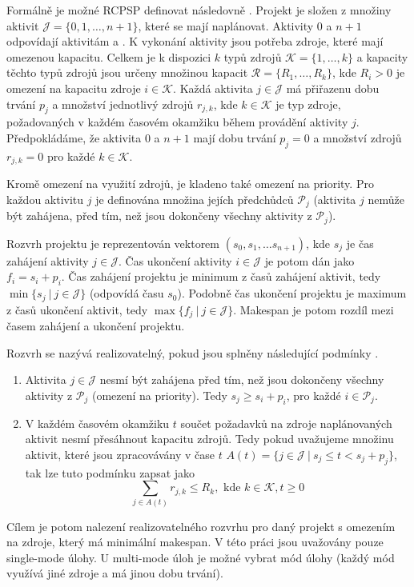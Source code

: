 \documentclass[a4paper,12pt]{article}
\begin{document}
Formálně je možné RCPSP definovat následovně \cite{Kolisch1999, Merkle00antcolony, 1027745}. Projekt je složen z množiny aktivit $\mathcal{J} = \{0,1,\dots, n+1\}$,
které se mají naplánovat. Aktivity $0$ a $n+1$ odpovídají aktivitám  a .
K vykonání aktivity jsou potřeba zdroje, které mají omezenou kapacitu. Celkem je k dispozici $k$ typů zdrojů $\mathcal{K} = \{1, \dots, k\}$ a kapacity 
těchto typů zdrojů jsou určeny množinou kapacit $\mathcal{R} = \{R_1, \dots, R_k\}$, kde $R_i > 0$ je omezení na kapacitu 
zdroje $i \in \mathcal{K}$. Každá aktivita $j\in\mathcal{J}$ má přiřazenu dobu trvání $p_j$ a množství jednotlivý zdrojů $r_{j,k}$, 
kde $k\in\mathcal{K}$ je typ zdroje, požadovaných v každém časovém okamžiku během provádění aktivity $j$.
Předpokládáme, že aktivita 0 a $n+1$ mají dobu trvání $p_j = 0$ a množství zdrojů $r_{j,k} = 0$ pro každé $k\in\mathcal{K}$. 

Kromě omezení
na využití zdrojů, je kladeno také omezení na priority. Pro každou aktivitu $j$ je definována množina jejích předchůdců $\mathcal{P}_j$ 
(aktivita $j$ nemůže být zahájena, před tím, než jsou dokončeny všechny aktivity z $\mathcal{P}_j$).

Rozvrh projektu je reprezentován vektorem $(s_0, s_1, \dots s_{n+1})$, kde $s_j$ je čas zahájení aktivity 
$j\in\mathcal{J}$. Čas ukončení aktivity $i\in\mathcal{J}$ je potom dán jako $f_i = s_i + p_i$. Čas zahájení
projektu je minimum z časů zahájení aktivit, tedy $\min\{s_j\ |\ j\in\mathcal{J}\}$ (odpovídá času $s_0$). Podobně čas ukončení 
projektu je maximum z časů ukončení aktivit, tedy $\max\{f_j\ |\ j\in\mathcal{J}\}$. Makespan je potom rozdíl
mezi časem zahájení a ukončení projektu. 

Rozvrh se nazývá realizovatelný, pokud jsou splněny následující podmínky \cite{Kolisch1999}.
\begin{enumerate}
 \item Aktivita $j\in\mathcal{J}$ nesmí být zahájena před tím, než jsou dokončeny všechny aktivity z $\mathcal{P}_j$ (omezení na priority).
  Tedy $s_j \geq s_i + p_i$, pro každé $i \in \mathcal{P}_j$.
 \item V každém časovém okamžiku $t$ součet požadavků na zdroje naplánovaných aktivit nesmí přesáhnout kapacitu zdrojů.
  Tedy pokud uvažujeme množinu aktivit, které jsou zpracovávány v čase $t$ $A(t) = \{j\in\mathcal{J}\ |\ s_j\leq t < s_j + p_j\}$, tak 
  lze tuto podmínku zapsat jako
  $$
    \sum_{j\in A(t)} r_{j,k} \leq R_k, \mbox{ kde } k\in\mathcal{K}, t \geq 0
  $$
\end{enumerate}
Cílem je potom nalezení realizovatelného rozvrhu pro daný projekt s omezením na zdroje, který má minimální makespan.
V této práci jsou uvažovány pouze single-mode úlohy. U multi-mode úloh je možné vybrat mód úlohy (každý mód využívá jiné
zdroje a má jinou dobu trvání). 
\end{document}
